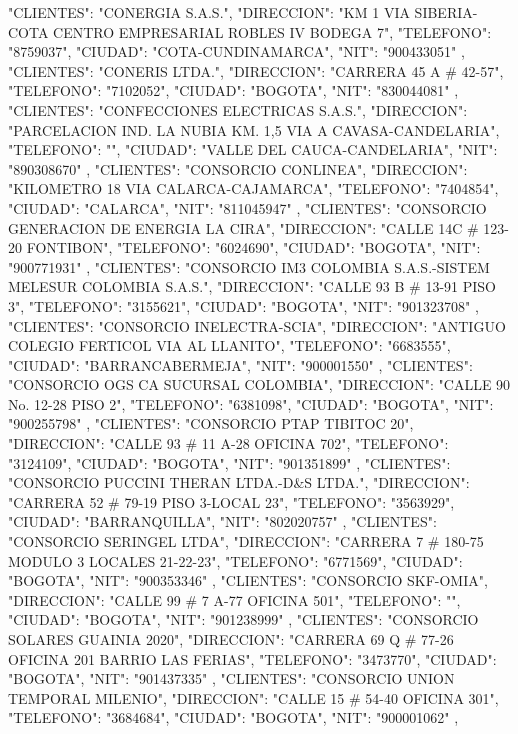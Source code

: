    {
   "CLIENTES": "CONERGIA S.A.S.",
   "DIRECCION": "KM 1 VIA SIBERIA-COTA CENTRO EMPRESARIAL ROBLES IV BODEGA 7",
   "TELEFONO": "8759037",
   "CIUDAD": "COTA-CUNDINAMARCA",
   "NIT": "900433051"
   },
   {
   "CLIENTES": "CONERIS LTDA.",
   "DIRECCION": "CARRERA 45 A # 42-57",
   "TELEFONO": "7102052",
   "CIUDAD": "BOGOTA",
   "NIT": "830044081"
   },
   {
   "CLIENTES": "CONFECCIONES ELECTRICAS S.A.S.",
   "DIRECCION": "PARCELACION IND. LA NUBIA KM. 1,5 VIA A CAVASA-CANDELARIA",
   "TELEFONO": "",
   "CIUDAD": "VALLE DEL CAUCA-CANDELARIA",
   "NIT": "890308670"
   },
   {
   "CLIENTES": "CONSORCIO CONLINEA",
   "DIRECCION": "KILOMETRO 18 VIA CALARCA-CAJAMARCA",
   "TELEFONO": "7404854",
   "CIUDAD": "CALARCA",
   "NIT": "811045947"
   },
   {
   "CLIENTES": "CONSORCIO GENERACION DE ENERGIA LA CIRA",
   "DIRECCION": "CALLE 14C # 123-20 FONTIBON",
   "TELEFONO": "6024690",
   "CIUDAD": "BOGOTA",
   "NIT": "900771931"
   },
   {
   "CLIENTES": "CONSORCIO IM3 COLOMBIA S.A.S.-SISTEM MELESUR COLOMBIA S.A.S.",
   "DIRECCION": "CALLE 93 B # 13-91 PISO 3",
   "TELEFONO": "3155621",
   "CIUDAD": "BOGOTA",
   "NIT": "901323708"
   },
   {
   "CLIENTES": "CONSORCIO INELECTRA-SCIA",
   "DIRECCION": "ANTIGUO COLEGIO FERTICOL VIA AL LLANITO",
   "TELEFONO": "6683555",
   "CIUDAD": "BARRANCABERMEJA",
   "NIT": "900001550"
   },
   {
   "CLIENTES": "CONSORCIO OGS CA SUCURSAL COLOMBIA",
   "DIRECCION": "CALLE 90 No. 12-28 PISO 2",
   "TELEFONO": "6381098",
   "CIUDAD": "BOGOTA",
   "NIT": "900255798"
   },
   {
   "CLIENTES": "CONSORCIO PTAP TIBITOC 20",
   "DIRECCION": "CALLE 93 # 11 A-28 OFICINA 702",
   "TELEFONO": "3124109",
   "CIUDAD": "BOGOTA",
   "NIT": "901351899"
   },
   {
   "CLIENTES": "CONSORCIO PUCCINI THERAN LTDA.-D&S LTDA.",
   "DIRECCION": "CARRERA 52 # 79-19 PISO 3-LOCAL 23",
   "TELEFONO": "3563929",
   "CIUDAD": "BARRANQUILLA",
   "NIT": "802020757"
   },
   {
   "CLIENTES": "CONSORCIO SERINGEL LTDA",
   "DIRECCION": "CARRERA 7 # 180-75 MODULO 3 LOCALES 21-22-23",
   "TELEFONO": "6771569",
   "CIUDAD": "BOGOTA",
   "NIT": "900353346"
   },
   {
   "CLIENTES": "CONSORCIO SKF-OMIA",
   "DIRECCION": "CALLE 99 # 7 A-77 OFICINA 501",
   "TELEFONO": "",
   "CIUDAD": "BOGOTA",
   "NIT": "901238999"
   },
   {
   "CLIENTES": "CONSORCIO SOLARES GUAINIA 2020",
   "DIRECCION": "CARRERA 69 Q # 77-26 OFICINA 201 BARRIO LAS FERIAS",
   "TELEFONO": "3473770",
   "CIUDAD": "BOGOTA",
   "NIT": "901437335"
   },
   {
   "CLIENTES": "CONSORCIO UNION TEMPORAL MILENIO",
   "DIRECCION": "CALLE 15 # 54-40 OFICINA 301",
   "TELEFONO": "3684684",
   "CIUDAD": "BOGOTA",
   "NIT": "900001062"
   },
